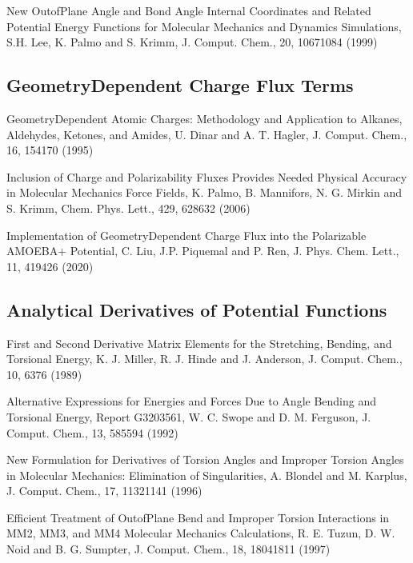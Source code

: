 \documentclass[letterpaper,11pt,english]{sphinxmanual}
\begin{document}
New Out\sphinxhyphen{}of\sphinxhyphen{}Plane Angle and Bond Angle Internal Coordinates and Related Potential Energy Functions for Molecular Mechanics and Dynamics Simulations, S.\sphinxhyphen{}H. Lee, K. Palmo and S. Krimm, J. Comput. Chem., 20, 1067\sphinxhyphen{}1084 (1999)


\subsection{Geometry\sphinxhyphen{}Dependent Charge Flux Terms}
\label{\detokenize{text/references:geometry-dependent-charge-flux-terms}}
Geometry\sphinxhyphen{}Dependent Atomic Charges: Methodology and Application to Alkanes, Aldehydes, Ketones, and Amides, U. Dinar and A. T. Hagler, J. Comput. Chem., 16, 154\sphinxhyphen{}170 (1995)

Inclusion of Charge and Polarizability Fluxes Provides Needed Physical Accuracy in Molecular Mechanics Force Fields, K. Palmo, B. Mannifors, N. G. Mirkin and S. Krimm, Chem. Phys. Lett., 429, 628\sphinxhyphen{}632 (2006)

Implementation of Geometry\sphinxhyphen{}Dependent Charge Flux into the Polarizable AMOEBA+ Potential, C. Liu, J.\sphinxhyphen{}P. Piquemal and P. Ren, J. Phys. Chem. Lett., 11, 419\sphinxhyphen{}426 (2020)


\subsection{Analytical Derivatives of Potential Functions}
\label{\detokenize{text/references:analytical-derivatives-of-potential-functions}}
First and Second Derivative Matrix Elements for the Stretching, Bending, and Torsional Energy, K. J. Miller, R. J. Hinde and J. Anderson, J. Comput. Chem., 10, 63\sphinxhyphen{}76 (1989)

Alternative Expressions for Energies and Forces Due to Angle Bending and Torsional Energy, Report G320\sphinxhyphen{}3561, W. C. Swope and D. M. Ferguson, J. Comput. Chem., 13, 585\sphinxhyphen{}594 (1992)

New Formulation for Derivatives of Torsion Angles and Improper Torsion Angles in Molecular Mechanics: Elimination of Singularities, A. Blondel and M. Karplus, J. Comput. Chem., 17, 1132\sphinxhyphen{}1141 (1996)

Efficient Treatment of Out\sphinxhyphen{}of\sphinxhyphen{}Plane Bend and Improper Torsion Interactions in MM2, MM3, and MM4 Molecular Mechanics Calculations, R. E. Tuzun, D. W. Noid and B. G. Sumpter, J. Comput. Chem., 18, 1804\sphinxhyphen{}1811 (1997)
\end{document}
